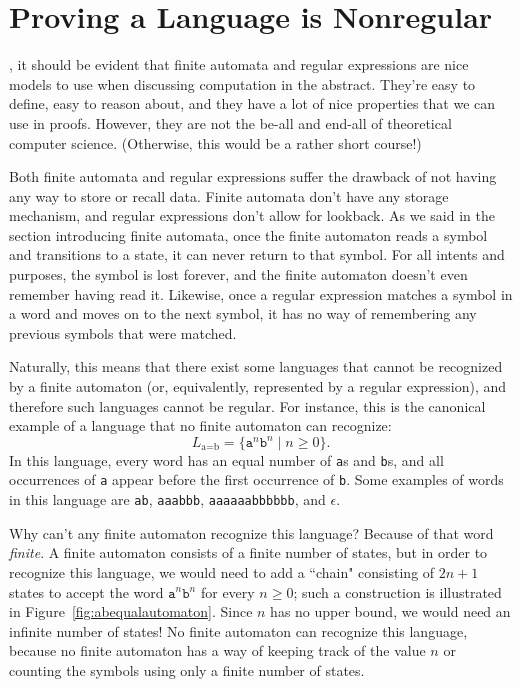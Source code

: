 \section{Proving a Language is Nonregular}\label{sec:nonregular}

, it should be evident that finite automata and regular expressions are nice models to use when discussing computation in the abstract. They're easy to define, easy to reason about, and they have a lot of nice properties that we can use in proofs. However, they are not the be-all and end-all of theoretical computer science. (Otherwise, this would be a rather short course!)

Both finite automata and regular expressions suffer the drawback of not having any way to store or recall data. Finite automata don't have any storage mechanism, and regular expressions don't allow for lookback. As we said in the section introducing finite automata, once the finite automaton reads a symbol and transitions to a state, it can never return to that symbol. For all intents and purposes, the symbol is lost forever, and the finite automaton doesn't even remember having read it. Likewise, once a regular expression matches a symbol in a word and moves on to the next symbol, it has no way of remembering any previous symbols that were matched.

Naturally, this means that there exist some languages that cannot be recognized by a finite automaton (or, equivalently, represented by a regular expression), and therefore such languages cannot be regular. For instance, this is the canonical example of a language that no finite automaton can recognize:
\begin{equation*}
L_{\text{a}=\text{b}} = \{\texttt{a}^{n}\texttt{b}^{n} \mid n \geq 0\}.
\end{equation*}
In this language, every word has an equal number of \texttt{a}s and \texttt{b}s, and all occurrences of \texttt{a} appear before the first occurrence of \texttt{b}. Some examples of words in this language are \texttt{ab}, \texttt{aaabbb}, \texttt{aaaaaabbbbbb}, and $\epsilon$.

Why can't any finite automaton recognize this language? Because of that word \emph{finite}. A finite automaton consists of a finite number of states, but in order to recognize this language, we would need to add a ``chain" consisting of $2n + 1$ states to accept the word $\texttt{a}^{n}\texttt{b}^{n}$ for every $n \geq 0$; such a construction is illustrated in Figure~\ref{fig:abequalautomaton}. Since $n$ has no upper bound, we would need an infinite number of states! No finite automaton can recognize this language, because no finite automaton has a way of keeping track of the value $n$ or counting the symbols using only a finite number of states.


